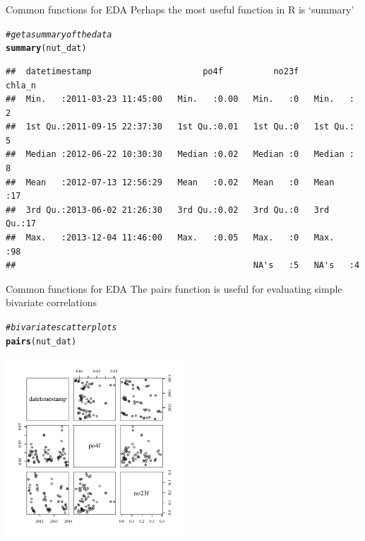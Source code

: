 \documentclass[xcolor=svgnames]{beamer}\usepackage[]{graphicx}\usepackage[]{color}
\makeatletter
\newcommand{\hlcom}[1]{\textcolor[rgb]{0.678,0.584,0.686}{\textit{#1}}}%
\newcommand{\hlstd}[1]{\textcolor[rgb]{0.345,0.345,0.345}{#1}}%
\newcommand{\hlkwd}[1]{\textcolor[rgb]{0.737,0.353,0.396}{\textbf{#1}}}%
\newenvironment{kframe}{%
 \def\at@end@of@kframe{}%
 \ifinner\ifhmode%
  \def\at@end@of@kframe{\end{minipage}}%
  \begin{minipage}{\columnwidth}%
 \fi\fi%
 \def\FrameCommand##1{\hskip\@totalleftmargin \hskip-\fboxsep
 \colorbox{shadecolor}{##1}\hskip-\fboxsep
     \hskip-\linewidth \hskip-\@totalleftmargin \hskip\columnwidth}%
 \MakeFramed {\advance\hsize-\width
   \@totalleftmargin\z@ \linewidth\hsize
   \@setminipage}}%
 {\par\unskip\endMakeFramed%
 \at@end@of@kframe}
\newenvironment{knitrout}{}{} %
\makeatother
\begin{document}
\begin{frame}[containsverbatim]{Common functions for EDA}
Perhaps the most useful function in R is `summary'
\begin{knitrout}\scriptsize
{}\color{fgcolor}\begin{kframe}
\begin{alltt}
\hlcom{# get a summary of the data}
\hlkwd{summary}\hlstd{(nut_dat)}
\end{alltt}
\begin{verbatim}
##  datetimestamp                      po4f          no23f       chla_n  
##  Min.   :2011-03-23 11:45:00   Min.   :0.00   Min.   :0   Min.   : 2  
##  1st Qu.:2011-09-15 22:37:30   1st Qu.:0.01   1st Qu.:0   1st Qu.: 5  
##  Median :2012-06-22 10:30:30   Median :0.02   Median :0   Median : 8  
##  Mean   :2012-07-13 12:56:29   Mean   :0.02   Mean   :0   Mean   :17  
##  3rd Qu.:2013-06-02 21:26:30   3rd Qu.:0.02   3rd Qu.:0   3rd Qu.:17  
##  Max.   :2013-12-04 11:46:00   Max.   :0.05   Max.   :0   Max.   :98  
##                                               NA's   :5   NA's   :4
\end{verbatim}
\end{kframe}
\end{knitrout}
\end{frame}

\begin{frame}[containsverbatim]{Common functions for EDA}
The pairs function is useful for evaluating simple bivariate correlations
\begin{knitrout}\scriptsize
{}\color{fgcolor}\begin{kframe}
\begin{alltt}
\hlcom{# bivariate scatterplots}
\hlkwd{pairs}\hlstd{(nut_dat)}
\end{alltt}
\end{kframe}

{\centering \includegraphics[width=0.5\textwidth]{figure/unnamed-chunk-4} 

}



\end{knitrout}
\end{frame}
\end{document}
